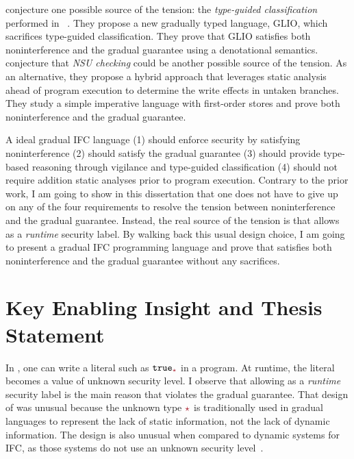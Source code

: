 \textcite{Amorim:2020aa} conjecture one possible source of the tension: the
\textit{type-guided classification} performed in
\GSLRef~\parencite{Toro:2018aa}. They propose a new gradually typed language,
GLIO, which sacrifices type-guided classification. They prove that GLIO
satisfies both noninterference and the gradual guarantee using a denotational
semantics.
%
\textcite{bichhawat2021gradual} conjecture that \textit{NSU checking} could be
another possible source of the tension. As an alternative, they propose a hybrid
approach that leverages static analysis ahead of program execution to determine
the write effects in untaken branches. They study a simple imperative language
with first-order stores and prove both noninterference and the gradual
guarantee.

A ideal gradual IFC language (1) should enforce security by
satisfying noninterference (2) should satisfy the gradual guarantee (3) should
provide type-based reasoning through vigilance and type-guided classification
(4) should not require addition static analyses prior to program execution.
Contrary to the prior work, I am going to show in this dissertation that one
does not have to give up on any of the four requirements to resolve the tension
between noninterference and the gradual guarantee. Instead, the real source of
the tension is that \GSLRef allows \unk as a \emph{runtime} security label. By
walking back this usual design choice, I am going to present a gradual
IFC programming language \Surface and prove that \Surface satisfies
both noninterference and the gradual guarantee without any sacrifices.

\section{Key Enabling Insight and Thesis Statement}

In \GSLRef{}, one can write a literal such as $\true_{\unk}$ in a program. At
runtime, the literal becomes a value of unknown security level. I observe that
allowing \unk as a \emph{runtime} security label is the main reason that \GSLRef
violates the gradual guarantee. That design of \GSLRef was unusual because the
unknown type $\unk$ is traditionally used in gradual languages to represent the
lack of static information, not the lack of dynamic information. The design is
also unusual when compared to dynamic systems for IFC, as those systems do not
use an unknown security
level~\parencite{Askarov:2009vq,austin2009efficient,Devriese:2010up,stefan2011flexible,Austin:2017uh}.

